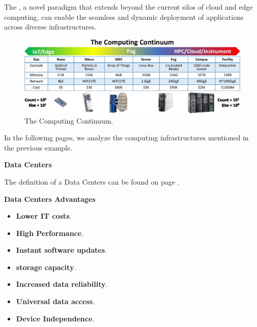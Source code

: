 \noindent
The , a novel paradigm that extends beyond the current silos of cloud and edge computing, can enable the seamless and dynamic deployment of applications across diverse infrastructures.\cite{marino2023computing}

\newpage

\begin{figure}[!htp]
    \centering
    \includegraphics[width=\textwidth]{img/computing-continuum-1.png}
    \caption{The Computing Continuum.\cite{computing-infrastructures-slides}}
\end{figure}

\noindent
In the following pages, we analyze the computing infrastructures mentioned in the previous example.

\longline

\begin{center}
    \large
    \textcolor{Red3}{\textbf{Data Centers}}
\end{center}

\noindent
The definition of a Data Centers can be found on page \pageref{Data Center definition}.

\begin{flushleft}
    \textcolor{Green3}{ \textbf{Data Centers Advantages}}
\end{flushleft}
\begin{itemize}
    \item \textbf{Lower IT costs}.
    \item \textbf{High Performance}.
    \item \textbf{Instant software updates}.
    \item \textbf{ storage capacity}.
    \item \textbf{Increased data reliability}.
    \item \textbf{Universal data access}.
    \item \textbf{Device Independence}.
\end{itemize}

